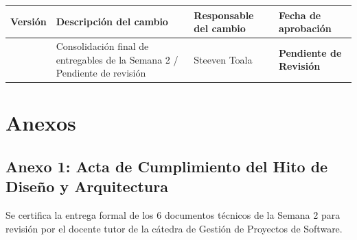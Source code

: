 \documentclass[12pt,a4paper]{article}
\begin{document}
\noindent
\renewcommand{\arraystretch}{1.2}
\begin{tabularx}{\textwidth}{|>{\hsize=0.45\hsize\centering\arraybackslash}X|>{\hsize=1.55\hsize\raggedright\arraybackslash}X|>{\hsize=1.2\hsize\raggedright\arraybackslash}X|>{\hsize=0.8\hsize\centering\arraybackslash}X|}
    \hline
    \rowcolor{gray!20}
    \textbf{Versión} & \textbf{Descripción del cambio} & \textbf{Responsable del cambio} & \textbf{Fecha de aprobación} \\
    \hline
    1.0 & Consolidación final de entregables de la Semana 2 / Pendiente de revisión & Steeven Toala & \textbf{\textcolor{gray!90}{Pendiente de Revisión}} \\
    \hline
\end{tabularx}

\vspace{0.4cm}

\section{Anexos}
\subsection*{Anexo 1: Acta de Cumplimiento del Hito de Diseño y Arquitectura}
Se certifica la entrega formal de los 6 documentos técnicos de la Semana 2 para revisión por el docente tutor de la cátedra de Gestión de Proyectos de Software.
\end{document}
